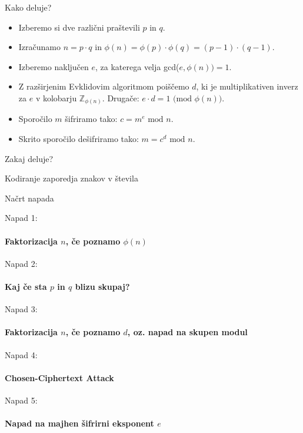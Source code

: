 \documentclass[a4paper, 12pt]{beamer} %
\begin{document}
\begin{frame}{Kako deluje?}
\begin{itemize}[label=]
\item<1-> Izberemo si dve različni praštevili $p$ in $q$.
\item<2-> Izračunamo $n = p \cdot q$ in $\phi(n) = \phi(p) \cdot \phi(q) = (p-1) \cdot (q-1).$
\item<3-> Izberemo naključen $e$, za katerega velja gcd($e, \phi(n)) = 1$.
\item<4-> Z razširjenim Evklidovim algoritmom poiščemo $d$, ki je multiplikativen inverz za $e$ v kolobarju $\mathbb{Z}_{\phi(n)}$. Drugače: $e \cdot d = 1 \text{ (mod } \phi(n))$.
\item<5-> Sporočilo $m$ šifriramo tako: $c = m^e \text{ mod } n$.
\item<6-> Skrito sporočilo dešifriramo tako: $m = c^d \text{ mod } n$.
\end{itemize}
\end{frame}

\begin{frame}{Zakaj deluje?}
\end{frame}

\begin{frame}{Kodiranje zaporedja znakov v števila}
\end{frame}

\begin{frame}{Načrt napada}
\end{frame}

\begin{frame}{Napad 1:}
\framesubtitle{Faktorizacija $n$, če poznamo $\phi(n)$}
\end{frame}

\begin{frame}{Napad 2:}
\framesubtitle{Kaj če sta $p$ in $q$ blizu skupaj?}
\end{frame}

\begin{frame}{Napad 3:}
\framesubtitle{Faktorizacija $n$, če poznamo $d$, oz. napad na skupen modul}
\end{frame}

\begin{frame}{Napad 4:}
\framesubtitle{Chosen-Ciphertext Attack}
\end{frame}

\begin{frame}{Napad 5:}
 \framesubtitle{Napad na majhen šifrirni eksponent $e$}
\end{frame}
\end{document}
